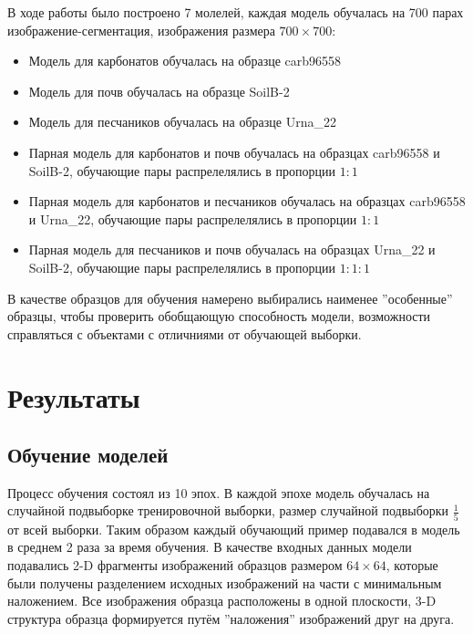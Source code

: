 \documentclass[14pt, a4paper, oneside, bold]{extarticle}
\begin{document}
В ходе работы было построено 7 молелей, каждая модель обучалась на 700 парах изображение-сегментация, изображения размера $700\times700$: 
\begin{itemize}
	\item Модель для карбонатов обучалась на образце carb96558
	
	\item Модель для почв обучалась на образце SoilB-2
	
	\item Модель для песчаников обучалась на образце Urna\_22
	
	\item Парная модель для карбонатов и почв обучалась на образцах carb96558 и SoilB-2, обучающие пары распрелелялись в пропорции $1:1$
	
	\item Парная модель для карбонатов и песчаников обучалась на образцах carb96558 и Urna\_22, обучающие пары распрелелялись в пропорции $1:1$
	
	\item  Парная модель для песчаников и почв обучалась на образцах Urna\_22 и SoilB-2, обучающие пары распрелелялись в пропорции $1:1:1$
\end{itemize}

В качестве образцов для обучения намерено выбирались наименее ''особенные'' образцы, чтобы проверить обобщающую способность модели, возможности справляться с объектами с отличниями от обучающей выборки.

\newpage


\section{Результаты}

\subsection{Обучение моделей}

Процесс обучения состоял из 10 эпох. В каждой эпохе модель обучалась на случайной подвыборке тренировочной выборки, размер случайной подвыборки $\frac{1}{5}$ от всей выборки. Таким образом каждый обучающий пример подавался в модель в среднем 2 раза за время обучения. В качестве входных данных модели подавались 2-D фрагменты изображений образцов размером $64 \times 64$, которые были получены разделением исходных изображений на части с минимальным наложением.
Все изображения образца расположены в одной плоскости, 3-D структура образца формируется путём ''наложения'' изображений друг на друга.
\end{document}
